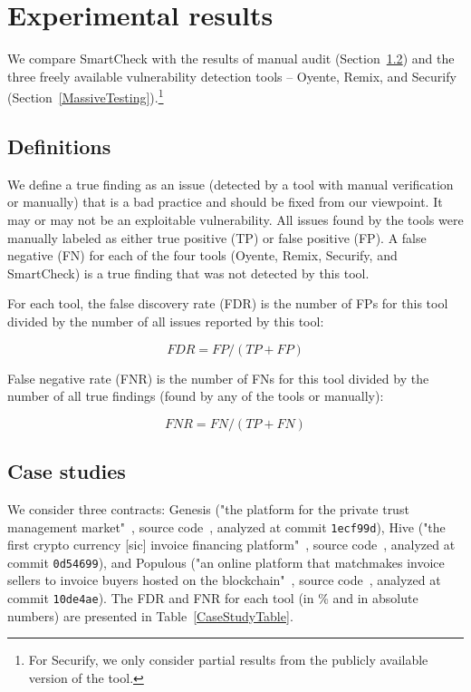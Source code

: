 \section{Experimental results} \label{SectionResults}

We compare SmartCheck with the results of manual audit (Section~\ref{ManualAudit}) and the three freely available vulnerability detection tools -- Oyente, Remix, and Securify (Section~\ref{MassiveTesting}).\footnote{For Securify, we only consider partial results from the publicly available version of the tool.}


\subsection{Definitions}

We define a true finding as an issue (detected by a tool with manual verification or manually) that is a bad practice and should be fixed from our viewpoint.
It may or may not be an exploitable vulnerability.
All issues found by the tools were manually labeled as either true positive (TP) or false positive (FP).
A false negative (FN) for each of the four tools (Oyente, Remix, Securify, and SmartCheck) is a true finding that was not detected by this tool.

For each tool, the false discovery rate (FDR) is the number of FPs for this tool divided by the number of all issues reported by this tool:

\[FDR = FP / (TP + FP)\]

False negative rate (FNR) is the number of FNs for this tool divided by the number of all true findings (found by any of the tools or manually):

\[FNR = FN / (TP + FN)\]


\subsection{Case studies} \label{ManualAudit}

We consider three contracts: Genesis ("the platform for the private trust management market"~\cite{Genesis}, source code~\cite{GenesisGithub}, analyzed at commit \texttt{1ecf99d}), Hive ("the first crypto currency [sic] invoice financing platform"~\cite{Hive}, source code~\cite{HiveGithub}, analyzed at commit \texttt{0d54699}), and Populous ("an online platform that matchmakes invoice sellers to invoice buyers hosted on the blockchain"~\cite{Populous}, source code~\cite{PopulousGithub}, analyzed at commit \texttt{10de4ae}).
The FDR and FNR for each tool (in \% and in absolute numbers) are presented in Table~\ref{CaseStudyTable}.

